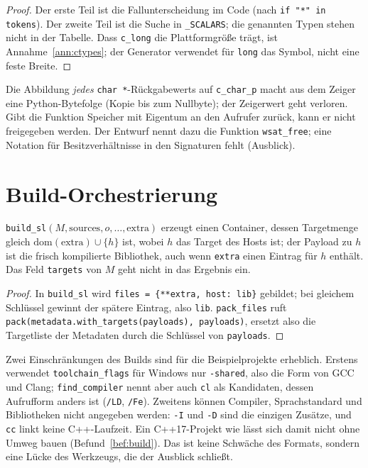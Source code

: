 \begin{proof}
	Der erste Teil ist die Fallunterscheidung im Code (nach \texttt{if "*" in tokens}). Der zweite Teil ist die Suche in \texttt{\_SCALARS}; die genannten Typen stehen nicht in der Tabelle. Dass \texttt{c\_long} die Plattformgröße trägt, ist Annahme~\ref{ann:ctypes}; der Generator verwendet für \texttt{long} das Symbol, nicht eine feste Breite.
\end{proof}

\begin{bemerkung}
	Die Abbildung \emph{jedes} \texttt{char *}-Rückgabewerts auf \texttt{c\_char\_p} macht aus dem Zeiger eine Python-Bytefolge (Kopie bis zum Nullbyte); der Zeigerwert geht verloren. Gibt die Funktion Speicher mit Eigentum an den Aufrufer zurück, kann er nicht freigegeben werden. Der Entwurf nennt dazu die Funktion \texttt{wsat\_free}; eine Notation für Besitzverhältnisse in den Signaturen fehlt (Ausblick).
\end{bemerkung}

\section{Build-Orchestrierung}

\begin{satz}
	\label{satz:build}
	\texttt{build\_sl}$(M,\mathrm{sources},o,\ldots,\mathrm{extra})$ erzeugt einen Container, dessen Targetmenge gleich $\mathrm{dom}(\mathrm{extra})\cup\{h\}$ ist, wobei $h$ das Target des Hosts ist; der Payload zu $h$ ist die frisch kompilierte Bibliothek, auch wenn \texttt{extra} einen Eintrag für $h$ enthält. Das Feld \texttt{targets} von $M$ geht nicht in das Ergebnis ein.
\end{satz}

\begin{proof}
	In \texttt{build\_sl} wird \texttt{files = \{**extra, host: lib\}} gebildet; bei gleichem Schlüssel gewinnt der spätere Eintrag, also \texttt{lib}. \texttt{pack\_files} ruft \texttt{pack(metadata.with\_targets(payloads), payloads)}, ersetzt also die Targetliste der Metadaten durch die Schlüssel von \texttt{payloads}.
\end{proof}

Zwei Einschränkungen des Builds sind für die Beispielprojekte erheblich. Erstens verwendet \texttt{toolchain\_flags} für Windows nur \texttt{-shared}, also die Form von GCC und Clang; \texttt{find\_compiler} nennt aber auch \texttt{cl} als Kandidaten, dessen Aufrufform anders ist (\texttt{/LD}, \texttt{/Fe}). Zweitens können Compiler, Sprachstandard und Bibliotheken nicht angegeben werden: \texttt{-I} und \texttt{-D} sind die einzigen Zusätze, und \texttt{cc} linkt keine C++-Laufzeit. Ein C++17-Projekt wie  lässt sich damit nicht ohne Umweg bauen (Befund~\ref{bef:build}). Das ist keine Schwäche des Formats, sondern eine Lücke des Werkzeugs, die der Ausblick schließt.

